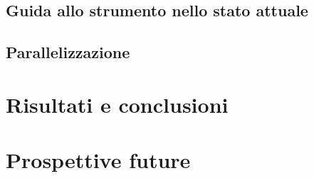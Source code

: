 \subsection{Guida allo strumento nello stato attuale}
\label{chap:pso-extra-guide}

\subsection{Parallelizzazione}

\section{Risultati e conclusioni}

\section{Prospettive future}
